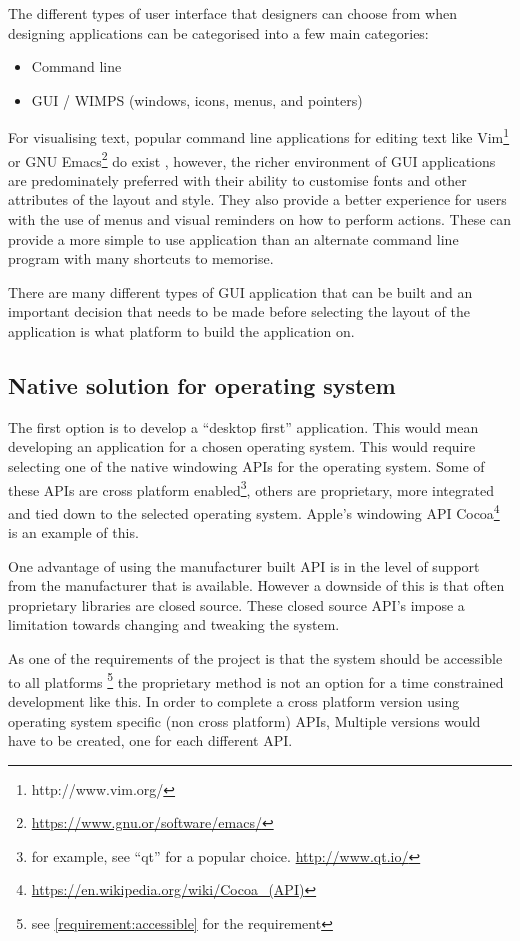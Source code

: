 The different types of user interface that designers can choose from
when designing applications can be categorised into a few main
categories:

\begin{itemize}
  \item Command line
  \item GUI / WIMPS (windows, icons, menus, and pointers)
\end{itemize}

For visualising text, popular command line applications for editing text like
Vim\footnote{http://www.vim.org/} or GNU
Emacs\footnote{\url{https://www.gnu.or/software/emacs/}} do exist , however, the
richer environment of GUI applications are predominately preferred with their
ability to customise fonts and other attributes of the layout and style. They
also provide a better experience for users with the use of menus and visual
reminders on how to perform actions. These can provide a more simple to use
application than an alternate command line program with many shortcuts to
memorise.

There are many different types of GUI application that can be built and
an important decision that needs to be made before selecting the layout
of the application is what platform to build the application on.

\subsection{Native solution for operating
system}\label{native-solution-for-operating-system}

The first option is to develop a ``desktop first'' application. This would mean
developing an application for a chosen operating system. This would require
selecting one of the native windowing APIs for the operating system. Some of
these APIs are cross platform enabled\footnote{for example, see ``qt'' for a
popular choice. \url{http://www.qt.io/}}, others are proprietary, more
integrated and tied down to the selected operating system. Apple's windowing
API Cocoa\footnote{\url{https://en.wikipedia.org/wiki/Cocoa_(API)}} is an
example of this.

One advantage of using the manufacturer built API is in the level of support
from the manufacturer that is available. However a downside of this is that
often proprietary libraries are closed source. These closed source API's impose
a limitation towards changing and tweaking the system.

As one of the requirements of the project is that the system should be
accessible to all platforms \footnote{ see \ref{requirement:accessible} for the
requirement} the proprietary method is not an option for a time constrained
development like this. In order to complete a cross platform version using
operating system specific (non cross platform) APIs, Multiple versions would
have to be created, one for each different API.

